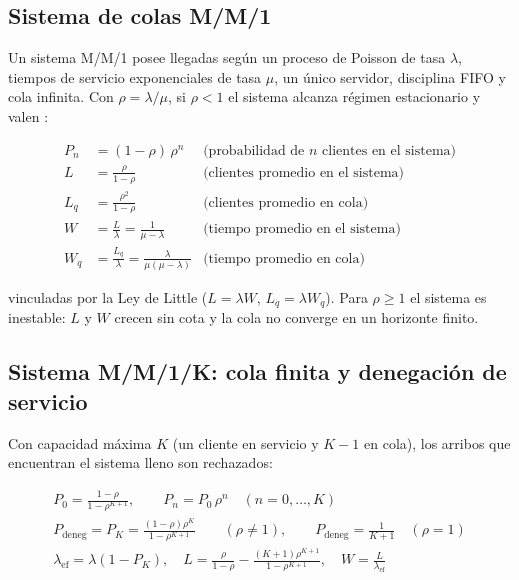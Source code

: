 \documentclass[11pt,a4paper]{article}
\begin{document}
\subsection{Sistema de colas M/M/1}

Un sistema M/M/1 posee llegadas según un proceso de Poisson de tasa
$\lambda$, tiempos de servicio exponenciales de tasa $\mu$, un único
servidor, disciplina FIFO y cola infinita. Con $\rho = \lambda/\mu$, si
$\rho < 1$ el sistema alcanza régimen estacionario y valen
\cite{winston,lawkelton}:

\begin{align}
    P_n &= (1-\rho)\,\rho^n & \text{(probabilidad de $n$ clientes en el sistema)} \\
    L   &= \frac{\rho}{1-\rho} & \text{(clientes promedio en el sistema)} \\
    L_q &= \frac{\rho^2}{1-\rho} & \text{(clientes promedio en cola)} \\
    W   &= \frac{L}{\lambda} = \frac{1}{\mu - \lambda} & \text{(tiempo promedio en el sistema)} \\
    W_q &= \frac{L_q}{\lambda} = \frac{\lambda}{\mu(\mu-\lambda)} & \text{(tiempo promedio en cola)}
\end{align}

vinculadas por la Ley de Little ($L = \lambda W$, $L_q = \lambda W_q$).
Para $\rho \geq 1$ el sistema es inestable: $L$ y $W$ crecen sin cota y la
cola no converge en un horizonte finito.

\subsection{Sistema M/M/1/K: cola finita y denegación de servicio}

Con capacidad máxima $K$ (un cliente en servicio y $K-1$ en cola), los
arribos que encuentran el sistema lleno son rechazados:

\begin{gather}
    P_0 = \frac{1-\rho}{1-\rho^{K+1}}, \qquad P_n = P_0\,\rho^n \quad (n=0,\dots,K) \\
    P_{\text{deneg}} = P_K = \frac{(1-\rho)\rho^K}{1-\rho^{K+1}} \qquad (\rho \neq 1), \qquad
    P_{\text{deneg}} = \frac{1}{K+1} \quad (\rho = 1) \\
    \lambda_{\text{ef}} = \lambda(1 - P_K), \quad
    L = \frac{\rho}{1-\rho} - \frac{(K+1)\rho^{K+1}}{1-\rho^{K+1}}, \quad
    W = \frac{L}{\lambda_{\text{ef}}}
\end{gather}
\end{document}
